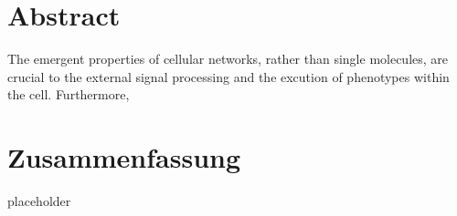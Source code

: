 \chapter*{Abstract}


The emergent properties of cellular networks, rather than single molecules, 
are crucial to the external signal processing and the excution of phenotypes
within the cell. Furthermore, 

\chapter*{Zusammenfassung}


placeholder


